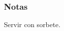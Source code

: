 \subsubsection{Notas}
\bigskip 
\begin{center}
\raggedright{}Servir con sorbete.
\end{center} 

\bigskip
\medskip 
\medskip


